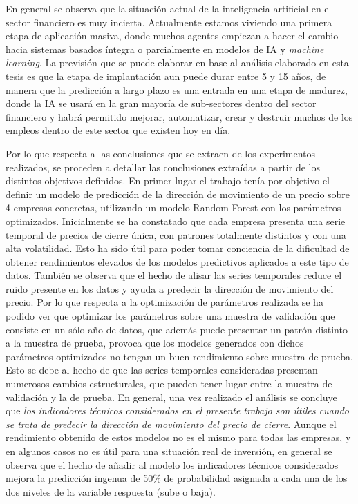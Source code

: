 \documentclass[]{DissertateUSU}
\begin{document}
\noindent En general se observa que la situación actual de la
inteligencia artificial en el sector financiero es muy incierta.
Actualmente estamos viviendo una primera etapa de aplicación masiva,
donde muchos agentes empiezan a hacer el cambio hacia sistemas basados
íntegra o parcialmente en modelos de IA y \emph{machine learning}. La
previsión que se puede elaborar en base al análisis elaborado en esta
tesis es que la etapa de implantación aun puede durar entre 5 y 15 años,
de manera que la predicción a largo plazo es una entrada en una etapa de
madurez, donde la IA se usará en la gran mayoría de sub-sectores dentro
del sector financiero y habrá permitido mejorar, automatizar, crear y
destruir muchos de los empleos dentro de este sector que existen hoy en
día.

\noindent Por lo que respecta a las conclusiones que se extraen de los
experimentos realizados, se proceden a detallar las conclusiones
extraídas a partir de los distintos objetivos definidos. En primer lugar
el trabajo tenía por objetivo el definir un modelo de predicción de la
dirección de movimiento de un precio sobre 4 empresas concretas,
utilizando un modelo Random Forest con los parámetros optimizados.
Inicialmente se ha constatado que cada empresa presenta una serie
temporal de precios de cierre única, con patrones totalmente distintos y
con una alta volatilidad. Esto ha sido útil para poder tomar conciencia
de la dificultad de obtener rendimientos elevados de los modelos
predictivos aplicados a este tipo de datos. También se observa que el
hecho de alisar las series temporales reduce el ruido presente en los
datos y ayuda a predecir la dirección de movimiento del precio. Por lo
que respecta a la optimización de parámetros realizada se ha podido ver
que optimizar los parámetros sobre una muestra de validación que
consiste en un sólo año de datos, que además puede presentar un patrón
distinto a la muestra de prueba, provoca que los modelos generados con
dichos parámetros optimizados no tengan un buen rendimiento sobre
muestra de prueba. Esto se debe al hecho de que las series temporales
consideradas presentan numerosos cambios estructurales, que pueden tener
lugar entre la muestra de validación y la de prueba. En general, una vez
realizado el análisis se concluye que \emph{los indicadores técnicos
considerados en el presente trabajo son útiles cuando se trata de
predecir la dirección de movimiento del precio de cierre}. Aunque el
rendimiento obtenido de estos modelos no es el mismo para todas las
empresas, y en algunos casos no es útil para una situación real de
inversión, en general se observa que el hecho de añadir al modelo los
indicadores técnicos considerados mejora la predicción ingenua de 50\%
de probabilidad asignada a cada una de los dos niveles de la variable
respuesta (sube o baja).
\end{document}
